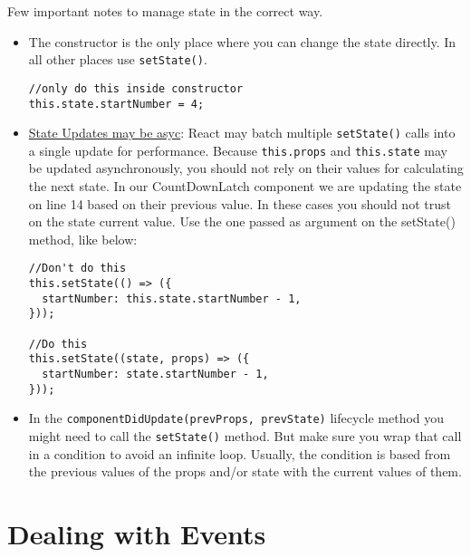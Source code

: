 \documentclass[a4paper, oneside, titlepage, 12pt]{book}
\begin{document}
Few important notes to manage state in the correct way.

\begin{itemize}
  \item The constructor is the only place where you can change the state directly. In all other places use \texttt{setState()}.
  \begin{verbatim}
//only do this inside constructor               
this.state.startNumber = 4;
\end{verbatim}
  \item \href{https://reactjs.org/docs/state-and-lifecycle.html}{State Updates may be asyc}: React may batch multiple \texttt{setState()} calls into a single update for performance. Because \texttt{this.props} and \texttt{this.state} may be updated asynchronously, you should not rely on their values for calculating the next state. In our CountDownLatch component we are updating the state on line 14 based on their previous value. In these cases you should not trust on the state current value. Use the one passed as argument on the setState() method, like below:
\begin{verbatim}
//Don't do this
this.setState(() => ({
  startNumber: this.state.startNumber - 1,
}));

//Do this
this.setState((state, props) => ({
  startNumber: state.startNumber - 1,
}));
\end{verbatim}
  \item In the \texttt{componentDidUpdate(prevProps, prevState)} lifecycle method you might need to call the \texttt{setState()} method. But make sure you wrap that call in a condition to avoid an infinite loop. Usually, the condition is based from the previous values of the props and/or state with the current values of them.
\end{itemize}


\section{Dealing with Events}
\end{document}
